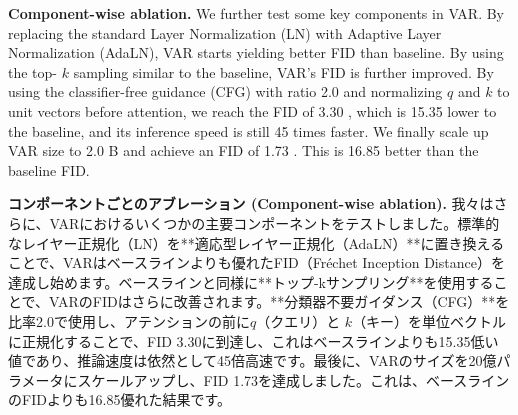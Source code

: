 \documentclass{article}
\begin{document}
\textbf{Component-wise ablation.} We further test some key components in VAR. By replacing the standard Layer Normalization (LN) with Adaptive Layer Normalization (AdaLN), VAR starts yielding better FID than baseline. By using the top- $k$ sampling similar to the baseline, VAR's FID is further improved. By using the classifier-free guidance (CFG) with ratio 2.0 and normalizing $q$ and $k$ to unit vectors before attention, we reach the FID of 3.30 , which is 15.35 lower to the baseline, and its inference speed is still 45 times faster. We finally scale up VAR size to 2.0 B and achieve an FID of 1.73 . This is 16.85 better than the baseline FID.

\textbf{コンポーネントごとのアブレーション (Component-wise ablation).}
我々はさらに、VARにおけるいくつかの主要コンポーネントをテストしました。標準的なレイヤー正規化（LN）を**適応型レイヤー正規化（AdaLN）**に置き換えることで、VARはベースラインよりも優れたFID（Fréchet Inception Distance）を達成し始めます。ベースラインと同様に**トップ-kサンプリング**を使用することで、VARのFIDはさらに改善されます。**分類器不要ガイダンス（CFG）**を比率2.0で使用し、アテンションの前に$q$（クエリ）と $k$（キー）を単位ベクトルに正規化することで、FID 3.30に到達し、これはベースラインよりも15.35低い値であり、推論速度は依然として45倍高速です。最後に、VARのサイズを20億パラメータにスケールアップし、FID 1.73を達成しました。これは、ベースラインのFIDよりも16.85優れた結果です。
\end{document}
